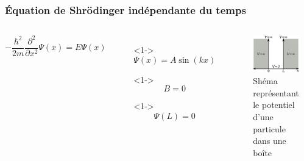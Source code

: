 \documentclass[aspectratio=169]{beamer}
\begin{document}
\begin{frame}
\frametitle{Équation de Shrödinger indépendante du temps}

\begin{columns}

\begin{equation}\tag{4}
-\frac{\hbar^2}{2m}\frac{\partial^2}{\partial x^2}\Psi(x)=E\Psi(x)
\end{equation} 

\begin{itemize}
\item[]<1-> \begin{equation}\tag{5}
\Psi(x)=A\sin(kx)
\end{equation} 
\item[]<1-> \begin{equation}\tag{6}
B=0
\end{equation} 
\item[]<1-> \begin{equation}\tag{7}
\Psi(L)=0
\end{equation} 
\end{itemize}
\begin{figure}
\includegraphics[scale=0.4]{Pot}
\caption{Shéma représentant le potentiel d'une particule dans une boîte}
\end{figure}
\end{columns}

\end{frame}
\end{document}
